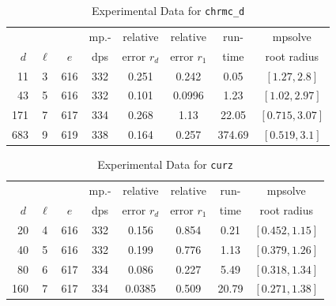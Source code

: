 \documentclass[runningheads]{llncs}
\begin{document}
\begin{table}
\caption{Experimental Data for \texttt{chrmc\_d}} %
\label{tab:chrmc_d}
\vskip -0.15in
\begin{center}
\begin{small}
\begin{sc}
\begin{tabular}{rccccccc}
\toprule
&  &  & mp.-& relative  & relative & run- & mpsolve \\
$d~$& $\ell$& $e$ & dps&error $r_d$       & error $r_1$ &time& root radius\\
\midrule
11 & 3 & 616 & 332 & 0.251 & 0.242 & 0.05 & $[1.27, 2.8]$\\
 43 & 5 & 616 & 332 & 0.101 & 0.0996 & 1.23 & $[1.02, 2.97]$\\
 171 & 7 & 617 & 334 & 0.268 & 1.13 & 22.05 & $[0.715, 3.07]$\\
 683 & 9 & 619 & 338 & 0.164 & 0.257 & 374.69 & $[0.519, 3.1]$\\
\bottomrule
\end{tabular}
\end{sc}
\end{small}
\end{center}
\vskip 0.05in
\end{table}


\begin{table}
\caption{Experimental Data for \texttt{curz}} %
\label{tab:curz}
\vskip -0.15in
\begin{center}
\begin{small}
\begin{sc}
\begin{tabular}{rccccccc}
\toprule
             &  &  & mp.-& relative  & relative & run- & mpsolve \\
$d~$& $\ell$& $e$ & dps&error $r_d$       & error $r_1$ &time& root radius\\
\midrule
 20 & 4 & 616 & 332 & 0.156 & 0.854 & 0.21 & $[0.452, 1.15]$\\
 40 & 5 & 616 & 332 & 0.199 & 0.776 & 1.13 & $[0.379, 1.26]$\\
 80 & 6 & 617 & 334 & 0.086 & 0.227 & 5.49 & $[0.318, 1.34]$\\
 160 & 7 & 617 & 334 & 0.0385 & 0.509 & 20.79 & $[0.271, 1.38]$\\
\bottomrule
\end{tabular}
\end{sc}
\end{small}
\end{center}
\vskip 0.05in
\end{table}
\end{document}
